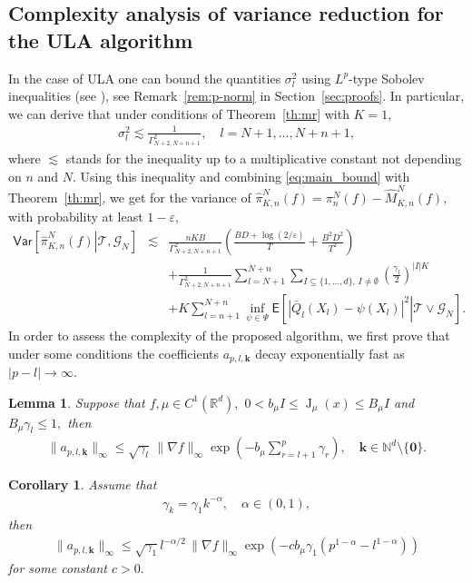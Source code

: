 \documentclass[bj]{imsart}
\def\NtrainPath{T}
\def\TrainSet{\mathcal{T}}
\newtheorem{lem}[thm]{Lemma}
\newtheorem{cor}{Corollary}
\newcommand{\jac}[1]{\operatorname{J} _{#1}}
\begin{document}
\subsection{Complexity analysis of variance reduction for the ULA algorithm}
In the case of ULA one can bound the quantities \(\sigma_l^2\) using  \(L^p\)-type Sobolev inequalities  (see \cite{Adamczak}), see Remark~\ref{rem:p-norm} in Section~\ref{sec:proofs}.
In particular, we can derive that  under conditions of Theorem~\ref{th:mr} with \(K=1,\)
\begin{eqnarray*}
\sigma_l^2\lesssim \frac{1}{\Gamma^2_{N+2,N+n+1}},\quad l=N+1,\ldots,N+n+1,
\end{eqnarray*}
where \(\lesssim \) stands for the inequality up to a multiplicative constant not depending on \(n\) and \(N.\) Using this inequality and combining \eqref{eq:main_bound} with Theorem~\ref{th:mr}, we get for the variance of \(\widehat \pi_{K,n}^N(f)=\pi_n^N(f)-\widehat M_{K,n}^N(f),\) with probability at least \(1-\varepsilon,\)
\begin{eqnarray}
\nonumber
\mathsf{Var}\left[\left.\widehat \pi_{K,n}^N(f)\right | \TrainSet, \mathcal{G}_N\right]&\lesssim & \frac{n KB}{\Gamma^2_{N+2,N+n+1}}
\left(\frac{BD+\log(2/\varepsilon)}{\NtrainPath}+\frac{B^2D^2}{\NtrainPath^2}\right)
\\
\nonumber
&& + \frac{1}{\Gamma^2_{N+2,N+n+1}}\sum_{l=N+1}^{N+n}\sum_{I\subseteq\{1,\ldots,d\},\, I\neq \emptyset}
\left(\frac{\gamma_{l}}{2}\right)^{|I|K}
\\
\label{eq:ula_red_var}
&& +
K \sum_{l=n+1}^{N+n}\inf_{\psi\in \Psi}
\mathsf{E}\left[\left.\left|\bar Q_l(X_{l})-\psi(X_{l})\right|^{2}\right | \TrainSet \vee \mathcal{G}_N \right].
\end{eqnarray}
In order to assess the complexity of the proposed algorithm,  we first prove that under some conditions the coefficients \(a_{p,l,\mathbf{k}}\) decay exponentially fast as \(|p-l|\to \infty.\)
\begin{lem}
\label{a_decay}
Suppose that \(f,\mu\in C^1(\mathbb{R}^d),\) \(0<b_\mu I\leq\jac{\mu}(x)\leq B_\mu I\) and \(B_\mu\gamma_{l}\leq 1,\) then
\begin{eqnarray*}
\|a_{p,l,\mathbf{k}}\|_{\infty}\leq \sqrt{\gamma_l}\, \|\nabla f\|_\infty\exp\left(-b_{\mu}\sum_{r=l+1}^p \gamma_{r}  \right),\quad \mathbf{k}\in \mathbb{N}^d\setminus \{\mathbf{0}\}.
\end{eqnarray*}
\end{lem}
\begin{cor}
Assume that
\begin{eqnarray}
\label{eq:gamk-decay}
\gamma_k=\gamma_1 k^{-\alpha},\quad \alpha\in (0,1),
\end{eqnarray}
 then
\begin{eqnarray*}
\|a_{p,l,\mathbf{k}}\|_{\infty}\leq \sqrt{\gamma_1} l^{-\alpha/2}\, \|\nabla f\|_\infty\exp\left(-c b_{\mu}\gamma_1 (p^{1-\alpha}-l^{1-\alpha}) \right)
\end{eqnarray*}
for some constant \(c>0.\)
\end{cor}
\end{document}
